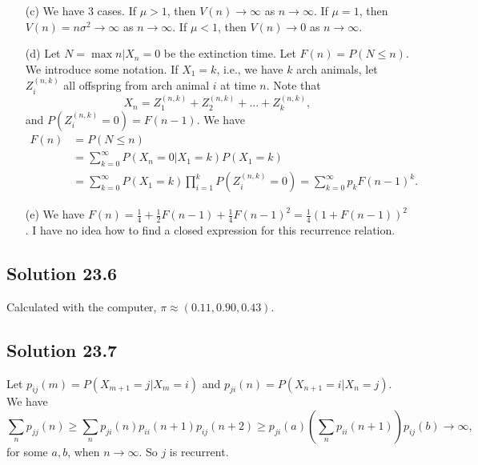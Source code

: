 \begin{itemize}
    \item[(c)] We have 3 cases.
        If $\mu > 1$, then $V(n) \to \infty$ as $n \to \infty$.
        If $\mu = 1$, then $V(n) = n \sigma^2 \to \infty$ as $n \to \infty$.
        If $\mu < 1$, then $V(n) \to 0$ as $n \to \infty$.
    \item[(d)] Let $N = \max{n | X_n = 0}$ be the extinction time.
        Let $F(n) = P(N \leq n)$.
        We introduce some notation.
        If $X_1 = k$, i.e., we have $k$ arch animals, let $Z_i^{(n, k)}$ all offspring from arch animal $i$ at time $n$.
        Note that
        \begin{equation*}
            X_n = Z_1^{(n, k)} + Z_2^{(n, k)} + ... + Z_k^{(n, k)},
        \end{equation*}
        and $P(Z_i^{(n, k)} = 0) = F(n - 1)$.
        We have
        \begin{equation*}
            \begin{split}
                F(n) &= P(N \leq n) \\
                    &= \sum_{k = 0}^{\infty} P(X_n = 0 | X_1 = k) P(X_1 = k) \\
                    &= \sum_{k = 0}^{\infty} P(X_1 = k) \prod_{i = 1}^k P(Z_i^{(n, k)} = 0)
                    = \sum_{k = 0}^{\infty} p_k F(n - 1)^k.
            \end{split}
        \end{equation*}
    \item[(e)] We have $F(n) = \frac{1}{4} + \frac{1}{2} F(n - 1) + \frac{1}{4} F(n - 1)^2 = \frac{1}{4}(1 + F(n - 1))^2$.
        I have no idea how to find a closed expression for this recurrence relation.
\end{itemize}


\subsection*{Solution 23.6}

Calculated with the computer, $\pi \approx (0.11, 0.90, 0.43)$.


\subsection*{Solution 23.7}

Let $p_{ij}(m) = P(X_{m + 1} = j | X_m = i)$ and $p_{ji}(n) = P(X_{n + 1} = i | X_n = j)$.
We have
\begin{equation*}
    \sum_{n} p_{jj}(n) \geq \sum_n p_{ji}(n) p_{ii}(n + 1) p_{ij}(n + 2)
        \geq p_{ji}(a) \left( \sum_n p_{ii}(n + 1) \right) p_{ij}(b)
        \to \infty,
\end{equation*}
for some $a, b$, when $n \to \infty$.
So $j$ is recurrent.


